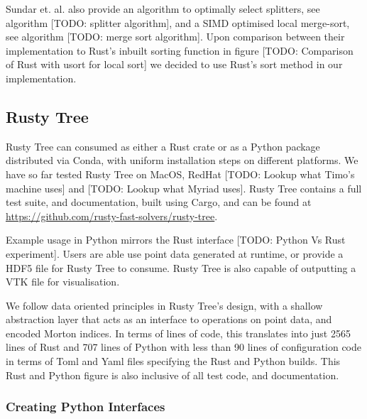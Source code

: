 Sundar et. al. also provide an algorithm to optimally select splitters, see algorithm [TODO: splitter algorithm], and a SIMD optimised local merge-sort, see algorithm [TODO: merge sort algorithm]. Upon comparison between their implementation to Rust's inbuilt sorting function in figure [TODO: Comparison of Rust with usort for local sort] we decided to use Rust's sort method in our implementation.

\subsection*{Rusty Tree}

Rusty Tree can consumed as either a Rust crate or as a Python package distributed via Conda, with uniform installation steps on different platforms. We have so far tested Rusty Tree on MacOS, RedHat [TODO: Lookup what Timo's machine uses] and [TODO: Lookup what Myriad uses]. Rusty Tree contains a full test suite, and documentation, built using Cargo, and can be found at \url{https://github.com/rusty-fast-solvers/rusty-tree}.

Example usage in Python mirrors the Rust interface [TODO: Python Vs Rust experiment]. Users are able use point data generated at runtime, or provide a HDF5 file for Rusty Tree to consume. Rusty Tree is also capable of outputting a VTK file for visualisation.

We follow data oriented principles in Rusty Tree's design, with a shallow abstraction layer that acts as an interface to operations on point data, and encoded Morton indices. In terms of lines of code, this translates into just 2565 lines of Rust and 707 lines of Python with less than 90 lines of configuration code in terms of Toml and Yaml files specifying the Rust and Python builds. This Rust and Python figure is also inclusive of all test code, and documentation. 


\subsubsection*{Creating Python Interfaces}

